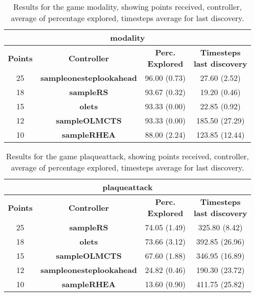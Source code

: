 \begin{table*}[!t]
\begin{center}
\begin{tabular}{|c|c|c|c|}
\multicolumn{4}{c}{\textbf{modality}}\\
\hline
\textbf{Points} & \textbf{Controller} & \textbf{Perc. Explored} &  \textbf{Timesteps last discovery}\\
\hline
25 & \textbf{sampleonesteplookahead} & 96.00 (0.73) & 27.60 (2.52)
 \\
\hline
18 & \textbf{sampleRS} & 93.67 (0.32) & 19.20 (0.46)
 \\
\hline
15 & \textbf{olets} & 93.33 (0.00) & 22.85 (0.92)
 \\
\hline
12 & \textbf{sampleOLMCTS} & 93.33 (0.00) & 185.50 (27.29)
 \\
\hline
10 & \textbf{sampleRHEA} & 88.00 (2.24) & 123.85 (12.44)
 \\
\hline
\end{tabular}
\caption{Results for the game modality, showing points received, controller, average of percentage explored, timesteps average for last discovery.}
\label{tab:weights}
\end{center}
\end{table*}
\begin{table*}[!t]
\begin{center}
\begin{tabular}{|c|c|c|c|}
\multicolumn{4}{c}{\textbf{plaqueattack}}\\
\hline
\textbf{Points} & \textbf{Controller} & \textbf{Perc. Explored} &  \textbf{Timesteps last discovery}\\
\hline
25 & \textbf{sampleRS} & 74.05 (1.49) & 325.80 (8.42)
 \\
\hline
18 & \textbf{olets} & 73.66 (3.12) & 392.85 (26.96)
 \\
\hline
15 & \textbf{sampleOLMCTS} & 67.60 (1.88) & 346.95 (16.89)
 \\
\hline
12 & \textbf{sampleonesteplookahead} & 24.82 (0.46) & 190.30 (23.72)
 \\
\hline
10 & \textbf{sampleRHEA} & 13.60 (0.90) & 411.75 (25.82)
 \\
\hline
\end{tabular}
\caption{Results for the game plaqueattack, showing points received, controller, average of percentage explored, timesteps average for last discovery.}
\label{tab:weights}
\end{center}
\end{table*}
